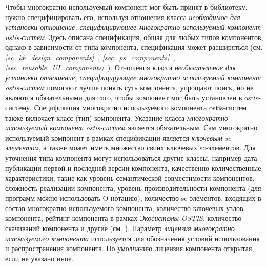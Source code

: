 Чтобы многократно используемый компонент мог быть принят в библиотеку, нужно специфицировать его, используя отношения класса \textit{необходимое для установки отношение, специфицирующее многократно используемый компонент ostis-систем}. Здесь описана спецификация, общая для любых типов компонентов, однако в зависимости от типа компонента, спецификация может расширяться (см. \textit{\ref{sc_kb_design_components}~, \ref{sec_ps_components}~, \ref{sec_reusable_UI_components}~}). Отношения класса \textit{необязательное для установки отношение, специфицирующее многократно используемый компонент ostis-систем} помогают лучше понять суть компонента, упрощают поиск, но не являются обязательными для того, чтобы компонент мог быть установлен в ostis-систему. Спецификация многократно используемого компонента ostis-систем также включает класс (тип) компонента. Указание класса \textit{многократно используемый компонент ostis-систем} является обязательным. Сам многократно используемый компонент в рамках спецификации является \textit{ключевым sc-элементом}, а также может иметь множество своих ключевых sc-элементов. Для уточнения типа компонента могут использоваться другие классы, например дата публикации первой и последней версии компонента, качественно-количественные характеристики, такие как уровень семантической совместимости компонентов, сложность реализации компонента, уровень производительности компонента (для программ можно использовать O-нотацию), количество sc-элементов, входящих в состав многократно используемого компонента, количество ключевых узлов компонента, рейтинг компонента в рамках \textit{Экосистемы OSTIS}, количество скачиваний компонента и другие (см. ). Параметр \textit{лицензия многократно используемого компонента} используется для обозначения условий использования и распространения компонента. По умолчанию лицензия компонента открытая, если не указано иное.

